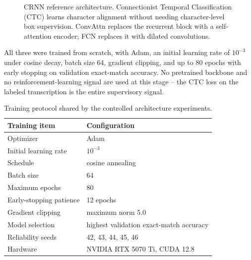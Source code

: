 \documentclass[10pt]{article}
\begin{document}
\begin{figure}[H]
\centering
{}
\caption{CRNN reference architecture. Connectionist Temporal Classification (CTC)
learns character alignment without needing character-level box supervision. ConvAttn
replaces the recurrent block with a self-attention encoder; FCN replaces it with
dilated convolutions.}
\label{fig:crnn}
\end{figure}

All three were trained from scratch, with Adam, an initial learning rate of $10^{-3}$
under cosine decay, batch size 64, gradient clipping, and up to 80 epochs with early
stopping on validation exact-match accuracy. No pretrained backbone and no
reinforcement-learning signal are used at this stage -- the CTC loss on the labeled
transcription is the entire supervisory signal.

\begin{table}[H]
\centering
\small
\begin{tabular}{@{}ll@{}}
\toprule
\textbf{Training item} & \textbf{Configuration} \\
\midrule
Optimizer & Adam \\
Initial learning rate & $10^{-3}$ \\
Schedule & cosine annealing \\
Batch size & 64 \\
Maximum epochs & 80 \\
Early-stopping patience & 12 epochs \\
Gradient clipping & maximum norm 5.0 \\
Model selection & highest validation exact-match accuracy \\
Reliability seeds & 42, 43, 44, 45, 46 \\
Hardware & NVIDIA RTX 5070 Ti, CUDA 12.8 \\
\bottomrule
\end{tabular}
\caption{Training protocol shared by the controlled architecture experiments.}
\label{tab:training-config}
\end{table}
\end{document}
